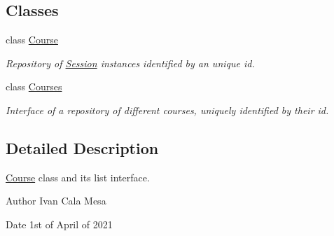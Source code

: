 \subsection*{Classes}
\begin{DoxyCompactItemize}
\item 
class \hyperlink{classCourse}{Course}
\begin{DoxyCompactList}\small\item\em Repository of \hyperlink{classSession}{Session} instances identified by an unique id. \end{DoxyCompactList}\item 
class \hyperlink{classCourses}{Courses}
\begin{DoxyCompactList}\small\item\em Interface of a repository of different courses, uniquely identified by their id. \end{DoxyCompactList}\end{DoxyCompactItemize}


\subsection{Detailed Description}
\hyperlink{classCourse}{Course} class and its list interface. 

\begin{DoxyAuthor}{Author}
Ivan Cala Mesa 
\end{DoxyAuthor}
\begin{DoxyDate}{Date}
1st of April of 2021 
\end{DoxyDate}
